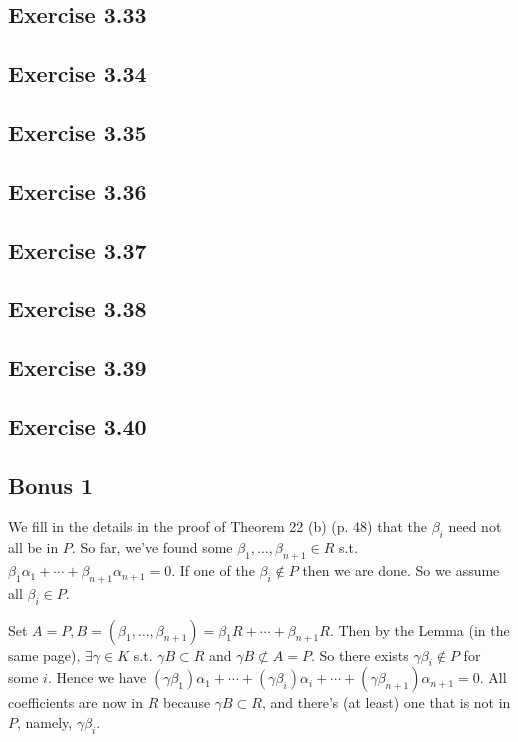\documentclass[../Marcus.tex]{subfiles}
\begin{document}
\subsection*{Exercise 3.33}

\subsection*{Exercise 3.34}

\subsection*{Exercise 3.35}

\subsection*{Exercise 3.36}

\subsection*{Exercise 3.37}

\subsection*{Exercise 3.38}

\subsection*{Exercise 3.39}

\subsection*{Exercise 3.40}

\subsection*{Bonus 1}

We fill in the details in the proof of Theorem 22 (b) (p. 48) that the $\beta_i$ need not all be in $P$. So far, we've found some $\beta_1,\ldots,\beta_{n+1}\in R$ s.t. $\beta_1\alpha_1+\cdots+\beta_{n+1}\alpha_{n+1}=0$. If one of the $\beta_i\notin P$ then we are done. So we assume all $\beta_i\in P$. 

Set $A=P,B=(\beta_1,\ldots,\beta_{n+1})=\beta_1R+\cdots+\beta_{n+1}R$. Then by the Lemma (in the same page), $\exists \gamma\in K$ s.t. $\gamma B\subset R$ and $\gamma B\not\subset A=P$. So there exists $\gamma\beta_i\notin P$ for some $i$. Hence we have $(\gamma\beta_1)\alpha_1+\cdots+(\gamma\beta_i)\alpha_i+\cdots+(\gamma\beta_{n+1})\alpha_{n+1}=0$. All coefficients are now in $R$ because $\gamma B\subset R$, and there's (at least) one that is not in $P$, namely, $\gamma\beta_i$.
\end{document}

